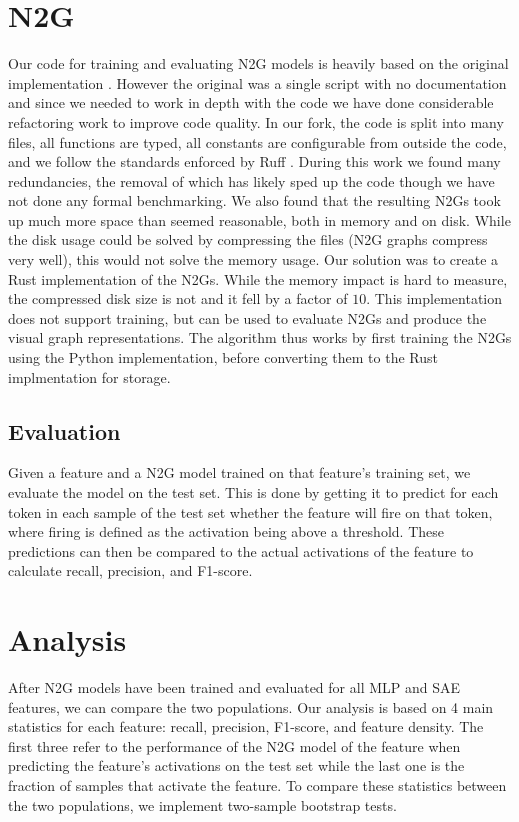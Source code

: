 \section{N2G}
Our code for training and evaluating N2G models is heavily based on the original implementation \parencite{foote_apartresearchneuron2graph_2024}.
However the original was a single script with no documentation and since we needed to work in depth with the code we have done considerable refactoring work to improve code quality.
In our fork, the code is split into many files, all functions are typed, all constants are configurable from outside the code, and we follow the standards enforced by Ruff \parencite{marsh_astral-shruff_2024}.
During this work we found many redundancies, the removal of which has likely sped up the code though we have not done any formal benchmarking.
We also found that the resulting N2Gs took up much more space than seemed reasonable, both in memory and on disk.
While the disk usage could be solved by compressing the files (N2G graphs compress very well), this would not solve the memory usage.
Our solution was to create a Rust implementation of the N2Gs.
While the memory impact is hard to measure, the compressed disk size is not and it fell by a factor of $10$.
This implementation does not support training, but can be used to evaluate N2Gs and produce the visual graph representations.
The algorithm thus works by first training the N2Gs using the Python implementation, before converting them to the Rust implmentation for storage.

\subsection{Evaluation}
Given a feature and a N2G model trained on that feature's training set, we evaluate the model on the test set.
This is done by getting it to predict for each token in each sample of the test set whether the feature will fire on that token, where firing is defined as the activation being above a threshold.
These predictions can then be compared to the actual activations of the feature to calculate recall, precision, and F1-score.

\section{Analysis}
After N2G models have been trained and evaluated for all MLP and SAE features, we can compare the two populations.
Our analysis is based on 4 main statistics for each feature: recall, precision, F1-score, and feature density.
The first three refer to the performance of the N2G model of the feature when predicting the feature's activations on the test set while the last one is the fraction of samples that activate the feature.
To compare these statistics between the two populations, we implement two-sample bootstrap tests.
